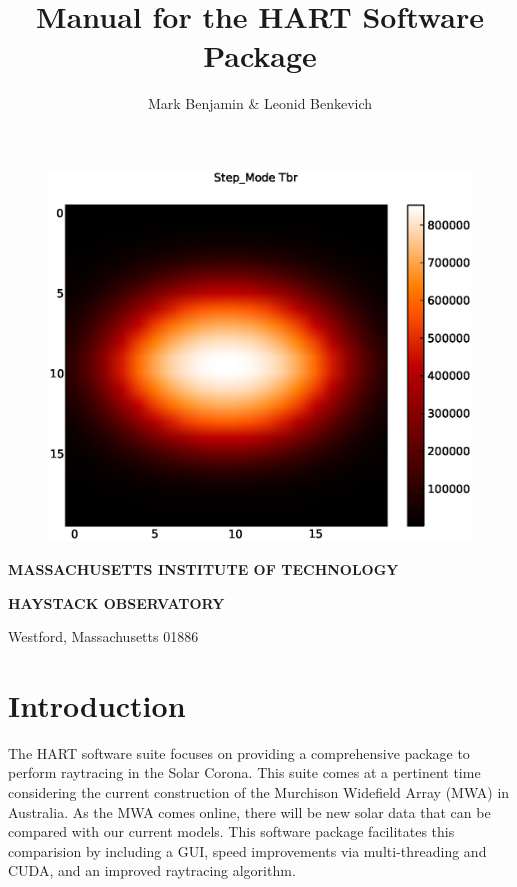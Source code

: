 \documentclass[12pt]{article}
\title{Manual for the HART Software Package}
\author{Mark Benjamin \& Leonid Benkevich}
\begin{document}
\maketitle
\bigskip

\begin{figure}[htb]
\begin{center}
\includegraphics[scale=.75]{tbr}
\end{center}
\end{figure}

\centerline{\large\bf MASSACHUSETTS INSTITUTE OF TECHNOLOGY}
\centerline{\large\bf HAYSTACK OBSERVATORY}
\smallskip
\centerline{\normalsize Westford, Massachusetts 01886}
\newpage

\tableofcontents

\newpage

\section{Introduction}
The HART software suite focuses on providing a comprehensive
package to perform raytracing in the Solar Corona. This
suite comes at a pertinent time considering the current construction of the
Murchison Widefield Array (MWA) in Australia. As the MWA comes online,
there will be new solar data that can be compared with our current
models. This software package facilitates this comparision by
including a GUI, speed improvements via multi-threading and CUDA, and
an improved raytracing algorithm.
\end{document}
